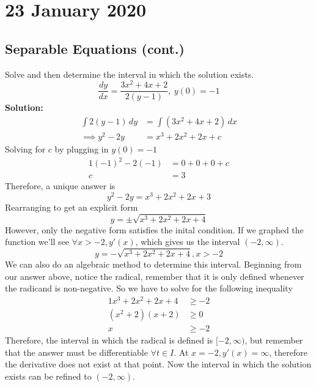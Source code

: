\documentclass[diffeq.tex]{subfiles}
\begin{document}
\chapter{23 January 2020}
    \section{Separable Equations (cont.)}
    \begin{example}[Textbook 2.2.2]
        Solve and then determine the interval in which the solution exists.
        \begin{equation}
            \frac{dy}{dx} = \frac{3x^{2} + 4x + 2}{2(y - 1)},\ y(0) = -1
        \end{equation}
        \textbf{Solution:}
        \begin{align}
            \int 2(y - 1)\,dy &= \int (3x^{2} + 4x + 2)\,dx\\
            \implies y^{2} - 2y &= x^{3} + 2x^{2} + 2x + c
        \end{align}
        Solving for $c$ by plugging in $y(0) = -1$
        \begin{alignat}{1}
            (-1)^{2} - 2(-1) &= 0 + 0 + 0 + c\\
            c &= 3
        \end{alignat}
        Therefore, a unique answer is
        \begin{equation}
            y^{2} - 2y = x^{3} + 2x^{2} + 2x + 3
        \end{equation}
        Rearranging to get an explicit form
        \begin{equation}
            y = \pm \sqrt{x^{3} + 2x^{2} + 2x + 4}
        \end{equation}
        However, only the negative form satisfies the inital condition. If we graphed the function we'll see $\forall x > -2, y'(x)$, which gives us the interval $(-2, \infty)$.
        \begin{equation}
            y = -\sqrt{x^{3} + 2x^{2} + 2x + 4}, x > -2
        \end{equation}
        We can also do an algebraic method to determine this interval. Beginning from our answer above, notice the radical, remember that it is only defined whenever the radicand is non-negative. So we have to solve for the following inequality
        \begin{alignat}{1}
            x^{3} + 2x^{2} + 2x + 4 &\geq -2\\
            (x^{2} + 2)(x + 2) &\geq 0\\
            x &\geq -2
        \end{alignat}
        Therefore, the interval in which the radical is defined is $[-2, \infty)$, but remember that the answer must be differentiable $\forall t \in I$. At $x = -2, y'(x) = \infty$, therefore the derivative does not exist at that point. Now the interval in which the solution exists can be refined to $(-2, \infty)$.
    \end{example}
\end{document}
